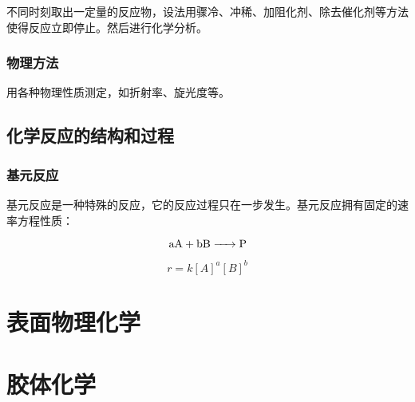 \documentclass[a4paper]{ctexrep}
\begin{document}
    不同时刻取出一定量的反应物，设法用骤冷、冲稀、加阻化剂、除去催化剂等方法使得反应立即停止。然后进行化学分析。
    
    \subsection{物理方法}

    用各种物理性质测定，如折射率、旋光度等。

    \section{化学反应的结构和过程}

    \subsection{基元反应}

    基元反应是一种特殊的反应，它的反应过程只在一步发生。基元反应拥有固定的速率方程性质：

    \begin{equation*}
      \ce{aA + bB -> P}
    \end{equation*}

    \begin{equation*}
      r = k[A]^a[B]^b 
    \end{equation*}

    \chapter{表面物理化学}

    \chapter{胶体化学}
\end{document}
